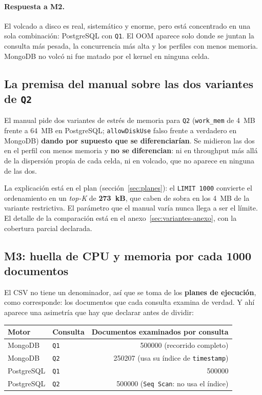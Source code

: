 \paragraph{Respuesta a M2.} El volcado a disco es real, sistemático y enorme, pero
está concentrado en una sola combinación: PostgreSQL con \texttt{Q1}. El OOM
aparece solo donde se juntan la consulta más pesada, la concurrencia más alta y
los perfiles con menos memoria. MongoDB no volcó ni fue matado por el kernel en
ninguna celda.

\subsection{La premisa del manual sobre las dos variantes de \texttt{Q2}}
\label{sec:variantes}

El manual pide dos variantes de estrés de memoria para \texttt{Q2}
(\texttt{work\_mem} de 4~MB frente a 64~MB en PostgreSQL;
\texttt{allowDiskUse} falso frente a verdadero en MongoDB) \textbf{dando por
supuesto que se diferenciarían}. Se midieron las dos en el perfil con menos
memoria y \textbf{no se diferencian}: ni en throughput más allá de la dispersión
propia de cada celda, ni en volcado, que no aparece en ninguna de las dos.

La explicación está en el plan (sección~\ref{sec:planes}): el
\texttt{LIMIT 1000} convierte el ordenamiento en un \emph{top-K} de
\textbf{273~kB}, que caben de sobra en los 4~MB de la variante restrictiva. El
parámetro que el manual varía nunca llega a ser el límite. El detalle de la
comparación está en el anexo~\ref{sec:variantes-anexo}, con la cobertura parcial
declarada.

\subsection{M3: huella de CPU y memoria por cada 1000 documentos}
\label{sec:memoria}

El CSV no tiene un denominador, así que se toma de los \textbf{planes de
ejecución}, como corresponde: los documentos que cada consulta examina de verdad.
Y ahí aparece una asimetría que hay que declarar antes de dividir:

\begin{center}
  \small
  \begin{tabular}{llr}
    \toprule
    Motor & Consulta & Documentos examinados por consulta \\
    \midrule
    MongoDB    & \texttt{Q1} & \num{500000} (recorrido completo) \\
    MongoDB    & \texttt{Q2} & \num{250207} (usa su índice de \texttt{timestamp}) \\
    PostgreSQL & \texttt{Q1} & \num{500000} \\
    PostgreSQL & \texttt{Q2} & \num{500000} (\texttt{Seq Scan}: no usa el índice) \\
    \bottomrule
  \end{tabular}
\end{center}

